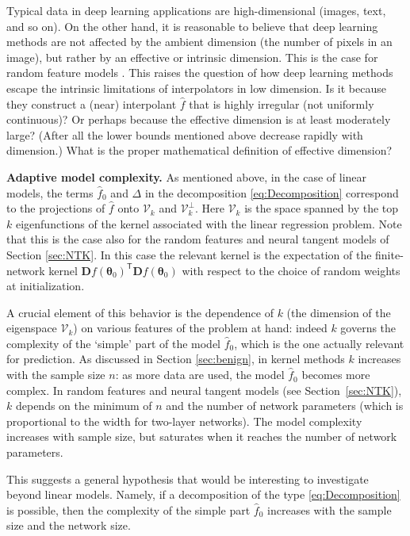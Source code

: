   Typical data in deep learning applications are  high-dimensional (images, text, and so on). On the other hand, it is reasonable to believe that deep learning methods are not affected by the ambient dimension (the number of pixels in an image), but rather by an effective or intrinsic dimension. This is the case for random feature models \cite{ghorbani2020neural}. This raises the question of how deep learning methods escape the intrinsic limitations of interpolators in low  dimension. Is it because they construct a (near) interpolant ${\widehat f}$ that is highly irregular (not  uniformly continuous)? Or perhaps because the effective dimension is at least moderately large?  (After all the lower bounds mentioned above decrease rapidly with dimension.) What is the proper mathematical definition of effective dimension?

{\bf Adaptive model complexity.} As mentioned above, in the case of linear models, the terms ${\widehat f}_0$ and $\Delta$ in the decomposition \eqref{eq:Decomposition} correspond to the projections of ${\widehat f}$ onto ${\mathcal V}_k$ and ${\mathcal V}_k^\perp$.
  Here ${\mathcal V}_k$ is the space spanned by the  top $k$ eigenfunctions  of the kernel associated with the linear regression problem. Note that this is the case also for the random features and neural tangent models of Section \ref{sec:NTK}. In this case the relevant kernel is the expectation of the finite-network kernel ${\boldsymbol D} f({\boldsymbol \theta}_0)^{{\mathsf T}}{\boldsymbol D} f({\boldsymbol \theta}_0)$
  with respect to the choice of random weights at initialization.

  A crucial element of this behavior is the dependence of $k$ (the dimension of the eigenspace  ${\mathcal V}_k$) on  various features of the problem at hand: indeed $k$ governs the complexity of the `simple' part of the model ${\widehat f}_0$, which is the one actually relevant for prediction. As discussed in Section \ref{sec:benign}, in kernel methods $k$ increases with the sample size $n$: as more data are used, the model ${\widehat f}_0$ becomes more complex. In random features and  neural tangent models (see Section~\ref{sec:NTK}),
  $k$ depends on the minimum of $n$ and the number of network parameters (which is proportional to the width for two-layer networks). The model complexity increases with sample size, but saturates when it reaches the number of network parameters.

  This suggests a general hypothesis that would be interesting to investigate beyond linear models. Namely, if a decomposition of the type \eqref{eq:Decomposition} is possible, then the complexity of the simple part ${\widehat f}_0$ increases with the sample size and the network size.

